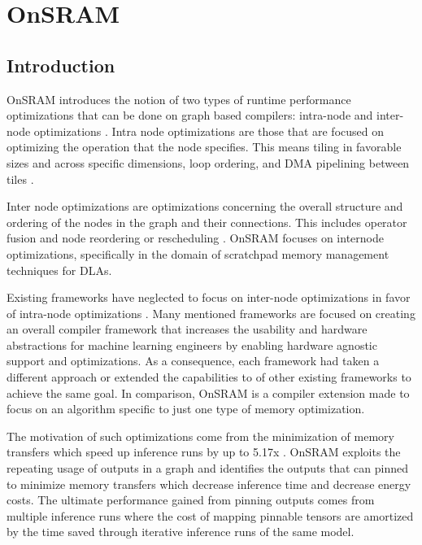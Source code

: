 
\chapter{OnSRAM} %

\label{Chapter3} %


\section{Introduction}

OnSRAM introduces the notion of two types of runtime performance optimizations
that can be done on graph based compilers: intra-node and inter-node
optimizations \cite{onsram}.  Intra node optimizations are those that are
focused on optimizing the operation that the node specifies. This means tiling
in favorable sizes and across specific dimensions, loop ordering, and DMA
pipelining between tiles \cite{aladdin}.

Inter node optimizations are optimizations concerning the overall structure and
ordering of the nodes in the graph and their connections. This includes
operator fusion and node reordering or rescheduling \cite{onsram}.
OnSRAM focuses on internode optimizations, specifically in the domain of
scratchpad memory management techniques for DLAs. 

Existing frameworks have neglected to focus on inter-node optimizations in favor
of intra-node optimizations \cite{tvm} \cite{deeptools} \cite{tensorflow}. Many 
mentioned frameworks are focused on creating an overall compiler framework that
increases the usability and hardware abstractions for machine learning engineers
by enabling hardware agnostic support and optimizations. As a consequence, each
framework had taken a different approach or extended the capabilities to of other
existing frameworks to achieve the same goal. In comparison, OnSRAM is a
compiler extension made to focus on an algorithm specific to just one type of
memory optimization.

The motivation of such optimizations come from the minimization of memory
transfers which speed up inference runs by up to 5.17x \cite{onsram}. OnSRAM
exploits the repeating usage of outputs in a graph and identifies the outputs
that can pinned to minimize memory transfers which decrease inference time and
decrease energy costs. The ultimate performance gained from pinning outputs comes from
multiple inference runs where the cost of mapping pinnable tensors are amortized by the
time saved through iterative inference runs of the same model.

